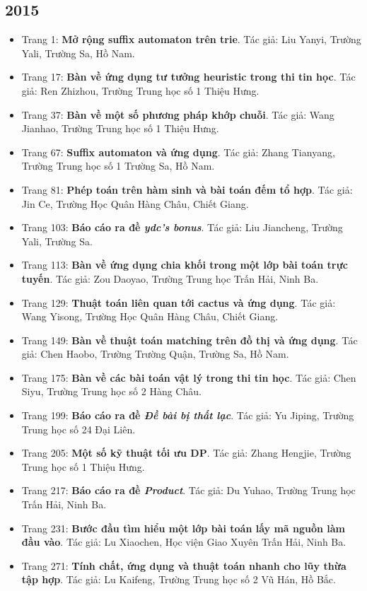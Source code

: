 \documentclass[11pt]{article}
\begin{document}
\subsection{2015}
\begin{itemize}[leftmargin=2em]
  \item Trang 1: \textbf{Mở rộng suffix automaton trên trie}. Tác giả: Liu Yanyi, Trường Yali, Trường Sa, Hồ Nam.
  \item Trang 17: \textbf{Bàn về ứng dụng tư tưởng heuristic trong thi tin học}. Tác giả: Ren Zhizhou, Trường Trung học số 1 Thiệu Hưng.
  \item Trang 37: \textbf{Bàn về một số phương pháp khớp chuỗi}. Tác giả: Wang Jianhao, Trường Trung học số 1 Thiệu Hưng.
  \item Trang 67: \textbf{Suffix automaton và ứng dụng}. Tác giả: Zhang Tianyang, Trường Trung học số 1 Trường Sa, Hồ Nam.
  \item Trang 81: \textbf{Phép toán trên hàm sinh và bài toán đếm tổ hợp}. Tác giả: Jin Ce, Trường Học Quân Hàng Châu, Chiết Giang.
  \item Trang 103: \textbf{Báo cáo ra đề \emph{ydc's bonus}}. Tác giả: Liu Jiancheng, Trường Yali, Trường Sa.
  \item Trang 113: \textbf{Bàn về ứng dụng chia khối trong một lớp bài toán trực tuyến}. Tác giả: Zou Daoyao, Trường Trung học Trấn Hải, Ninh Ba.
  \item Trang 129: \textbf{Thuật toán liên quan tới cactus và ứng dụng}. Tác giả: Wang Yisong, Trường Học Quân Hàng Châu, Chiết Giang.
  \item Trang 149: \textbf{Bàn về thuật toán matching trên đồ thị và ứng dụng}. Tác giả: Chen Haobo, Trường Trường Quận, Trường Sa, Hồ Nam.
  \item Trang 175: \textbf{Bàn về các bài toán vật lý trong thi tin học}. Tác giả: Chen Siyu, Trường Trung học số 2 Hàng Châu.
  \item Trang 199: \textbf{Báo cáo ra đề \emph{Đề bài bị thất lạc}}. Tác giả: Yu Jiping, Trường Trung học số 24 Đại Liên.
  \item Trang 205: \textbf{Một số kỹ thuật tối ưu DP}. Tác giả: Zhang Hengjie, Trường Trung học số 1 Thiệu Hưng.
  \item Trang 217: \textbf{Báo cáo ra đề \emph{Product}}. Tác giả: Du Yuhao, Trường Trung học Trấn Hải, Ninh Ba.
  \item Trang 231: \textbf{Bước đầu tìm hiểu một lớp bài toán lấy mã nguồn làm đầu vào}. Tác giả: Lu Xiaochen, Học viện Giao Xuyên Trấn Hải, Ninh Ba.
  \item Trang 271: \textbf{Tính chất, ứng dụng và thuật toán nhanh cho lũy thừa tập hợp}. Tác giả: Lu Kaifeng, Trường Trung học số 2 Vũ Hán, Hồ Bắc.
\end{itemize}
\end{document}
